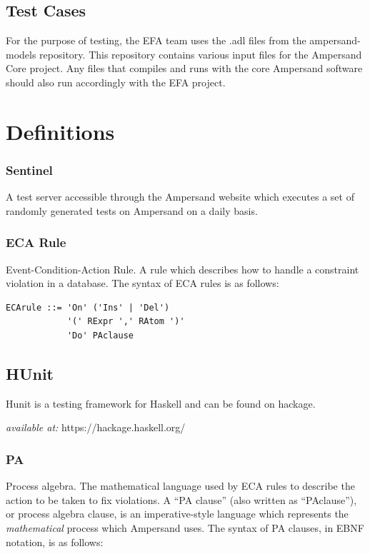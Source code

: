 \documentclass[12pt, svgnames]{article}
\begin{document}
\subsection{Test Cases}
For the purpose of testing, the EFA team uses the .adl files from the ampersand-models repository. This repository contains various input files for the Ampersand Core project. Any files that compiles and runs with the core Ampersand software should also run accordingly with the EFA project.

\section{Definitions}\label{sec:Abbrev}

 \subsubsection*{Sentinel}
A test server accessible through the Ampersand website which executes a set of 
randomly generated tests on Ampersand on a daily basis.

\subsubsection*{ECA Rule}
 Event-Condition-Action Rule. A rule which describes how to handle a constraint
 violation in a database. The syntax of ECA rules is as follows:
 

\begin{lstlisting}[basicstyle=\ttfamily]
ECArule ::= 'On' ('Ins' | 'Del') 
            '(' RExpr ',' RAtom ')'
            'Do' PAclause    
\end{lstlisting}

\subsection*{HUnit}
Hunit is a testing framework for Haskell and can be found on hackage.

\textit{available at:} https://hackage.haskell.org/

\subsubsection*{PA}
Process algebra. The mathematical language used by ECA rules to describe the
action to be taken to fix violations. A ``PA clause'' (also written as
``PAclause''), or process algebra clause, is an imperative-style language which
represents the \emph{mathematical} process which Ampersand uses. The syntax of
PA clauses, in EBNF notation, is as follows:
\end{document}
